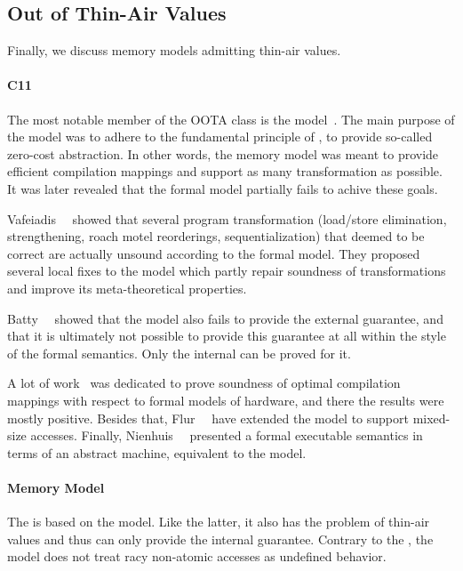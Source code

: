 \subsection{Out of Thin-Air Values}

Finally, we discuss memory models admitting thin-air values. 

\paragraph{C11}

The most notable member of the OOTA class is the \CMM model~\cite{Batty-al:POPL11}.
The main purpose of the \CMM model was to adhere to the fundamental principle of \CPP, 
\ie to provide so-called zero-cost abstraction. 
In other words, the memory model was meant to provide 
efficient compilation mappings and support as many transformation as possible.
It was later revealed that the formal model partially fails to achive these goals.

Vafeiadis~\etal~\cite{Vafeiadis-al:POPL15} showed that several program transformation 
(load/store elimination, strengthening, roach motel reorderings, sequentialization) 
that deemed to be correct are actually unsound according to the formal model.
They proposed several local fixes to the model which 
partly repair soundness of transformations and improve 
its meta-theoretical properties. 

Batty~\etal~\cite{Batty-al:ESOP15} showed that 
the model also fails to provide the external \DRF guarantee, 
and that it is ultimately not possible to provide this guarantee
at all within the style of the \CMM formal semantics.
Only the internal \DRF can be proved for it. 

A lot of work~\cite{Batty-al:POPL11, Sarkar-al:PLDI12, Batty-al:POPL12, Batty-al:POPL16} 
was dedicated to prove soundness of optimal compilation mappings 
with respect to formal models of hardware, 
and there the results were mostly positive.
Besides that, Flur~\etal~\cite{Flur-al:POPL17} have extended 
the model to support mixed-size accesses.
Finally, Nienhuis~\etal~\cite{Nienhuis-al:OOPSLA16} presented 
a formal executable semantics in terms of an abstract machine, 
equivalent to the \CMM model. 

\paragraph{\JS Memory Model}

The \JSMM is based on the \CMM model. 
Like the latter, it also has the problem of thin-air values
and thus can only provide the internal \DRF guarantee. 
Contrary to the \CMM, the \JS model does not treat 
racy non-atomic accesses as undefined behavior. 

